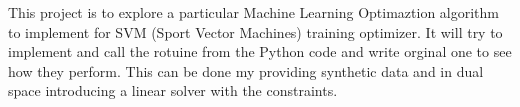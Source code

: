 This project is to explore a particular Machine Learning Optimaztion 
algorithm to implement for SVM (Sport Vector Machines)  training optimizer.  It will try to implement and call the rotuine from the Python code and write 
orginal one to see how they perform. This can be done my providing
synthetic data and in dual space introducing a linear solver with
the constraints.  